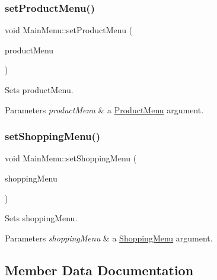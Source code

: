 \subsubsection{\texorpdfstring{set\+Product\+Menu()}{setProductMenu()}}
{\footnotesize\ttfamily void Main\+Menu\+::set\+Product\+Menu (\begin{DoxyParamCaption}\item[{\hyperlink{classProductMenu}{Product\+Menu} $\ast$}]{product\+Menu }\end{DoxyParamCaption})}



Sets product\+Menu. 


\begin{DoxyParams}{Parameters}
{\em product\+Menu} & a \hyperlink{classProductMenu}{Product\+Menu} argument. \\
\hline
\end{DoxyParams}
\mbox{\label{classMainMenu_ae8cab8d0e2430d34bad64ba238b4cc4d}} 
\subsubsection{\texorpdfstring{set\+Shopping\+Menu()}{setShoppingMenu()}}
{\footnotesize\ttfamily void Main\+Menu\+::set\+Shopping\+Menu (\begin{DoxyParamCaption}\item[{\hyperlink{classShoppingMenu}{Shopping\+Menu} $\ast$}]{shopping\+Menu }\end{DoxyParamCaption})}



Sets shopping\+Menu. 


\begin{DoxyParams}{Parameters}
{\em shopping\+Menu} & a \hyperlink{classShoppingMenu}{Shopping\+Menu} argument. \\
\hline
\end{DoxyParams}


\subsection{Member Data Documentation}
\mbox{\label{classMainMenu_a70561c3a6ca04aaa2d7a28d4b157a462}} 
